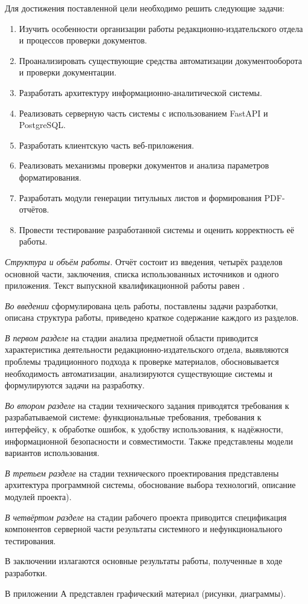 Для достижения поставленной цели необходимо решить следующие задачи:
\begin{enumerate}
	\item Изучить особенности организации работы редакционно-издательского отдела и процессов проверки документов.
	\item Проанализировать существующие средства автоматизации документооборота и проверки документации.
	\item Разработать архитектуру информационно-аналитической системы.
	\item Реализовать серверную часть системы с использованием FastAPI и PostgreSQL.
	\item Разработать клиентскую часть веб-приложения.
	\item Реализовать механизмы проверки документов и анализа параметров форматирования. 
	\item Разработать модули генерации титульных листов и формирования PDF-отчётов. 
	\item Провести тестирование разработанной системы и оценить корректность её работы.
\end{enumerate}

\textit{Структура и объём работы.} Отчёт состоит из введения, четырёх разделов основной части, заключения, списка использованных источников и одного приложения. Текст выпускной квалификационной работы равен .

\textit{Во введении} сформулирована цель работы, поставлены задачи разработки, описана структура работы, приведено краткое содержание каждого из разделов.

\textit{В первом разделе} на стадии анализа предметной области приводится характеристика деятельности редакционно-издательского отдела, выявляются проблемы традиционного подхода к проверке материалов, обосновывается необходимость автоматизации, анализируются существующие системы и формулируются задачи на разработку.

\textit{Во втором разделе} на стадии технического задания приводятся требования к разрабатываемой системе: функциональные требования, требования к интерфейсу, к обработке ошибок, к удобству использования, к надёжности, информационной безопасности и совместимости. Также представлены модели вариантов использования.

\textit{В третьем разделе} на стадии технического проектирования представлены архитектура программной системы, обоснование выбора технологий, описание модулей проекта).

\textit{В четвёртом разделе} на стадии рабочего проекта приводится спецификация компонентов серверной части результаты системного и нефункционального тестирования.

В заключении излагаются основные результаты работы, полученные в ходе разработки.

В приложении А представлен графический материал (рисунки, диаграммы).